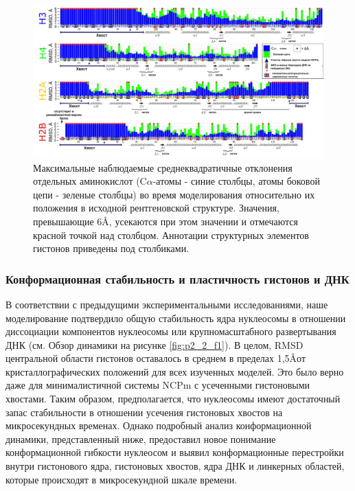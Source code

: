 \begin{figure} [H]
    \centering
    \includegraphics[width=\textwidth]{images/p2/jmb/part2_2_f2.pdf}
    \caption[Максимальные наблюдаемые среднеквадратичные отклонения отдельных аминокислот гистонов 
    в МД моделировании]{Максимальные наблюдаемые среднеквадратичные отклонения отдельных 
    аминокислот (C$\alpha$-атомы - синие столбцы, атомы боковой цепи - зеленые столбцы) во время
     моделирования относительно их положения в исходной рентгеновской структуре. 
     Значения, превышающие 6\AA, усекаются при этом значении и отмечаются красной точкой над столбцом.
      Аннотации структурных элементов гистонов приведены под столбиками.}
    \label{fig:p2_2_f2}
\end{figure}



\subsubsection{Конформационная стабильность и пластичность гистонов и ДНК}

    В соответствии с предыдущими экспериментальными исследованиями, наше моделирование подтвердило общую стабильность ядра нуклеосомы в отношении диссоциации компонентов нуклеосомы или крупномасштабного развертывания ДНК (см. Обзор динамики на рисунке \ref{fig:p2_2_f1}). В целом, RMSD центральной области гистонов оставалось в среднем в пределах 1,5\AA от кристаллографических положений для всех изученных моделей. Это было верно даже для минималистичной системы NCPm с усеченными гистоновыми хвостами. Таким образом, предполагается, что нуклеосомы имеют достаточный запас стабильности в отношении усечения гистоновых хвостов на микросекундных временах. Однако подробный анализ конформационной динамики, представленный ниже, предоставил новое понимание конформационной гибкости нуклеосом и выявил конформационные перестройки внутри гистонового ядра, гистоновых хвостов, ядра ДНК и линкерных областей, которые происходят в микросекундной шкале времени.

